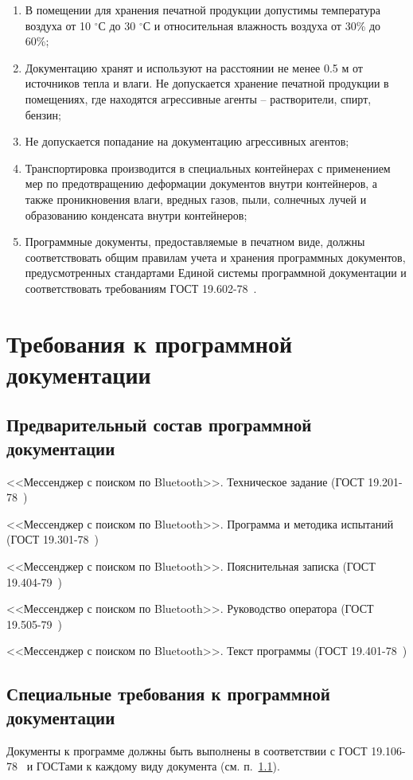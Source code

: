 \documentclass[techtask]{espd}
\begin{document}
\begin{enumerate}
\item В помещении для хранения печатной продукции допустимы температура воздуха от 10 $^\circ$С до 30 $^\circ$С и относительная влажность воздуха от 30\% до 60\%;
\item Документацию хранят и используют на расстоянии не менее 0.5 м от источников тепла и влаги. Не допускается хранение печатной продукции в помещениях, где находятся агрессивные агенты – растворители, спирт, бензин;
\item Не допускается попадание на документацию агрессивных агентов;
\item Транспортировка производится в специальных контейнерах с применением мер по предотвращению деформации документов внутри контейнеров, а также проникновения влаги, вредных газов, пыли, солнечных лучей и образованию конденсата внутри контейнеров;
\item Программные документы, предоставляемые в печатном виде, должны соответствовать общим правилам учета и хранения программных документов, предусмотренных стандартами Единой системы программной документации и соответствовать требованиям ГОСТ 19.602-78~\cite{espd602}.
\end{enumerate}

\section{Требования к программной документации}
\subsection{Предварительный состав программной документации}\label{subsection:documentation}
<<Мессенджер с поиском по Bluetooth>>. Техническое задание (ГОСТ 19.201-78~\cite{espd201})

<<Мессенджер с поиском по Bluetooth>>. Программа и методика испытаний (ГОСТ 19.301-78~\cite{espd301})

<<Мессенджер с поиском по Bluetooth>>. Пояснительная записка (ГОСТ 19.404-79~\cite{espd404})

<<Мессенджер с поиском по Bluetooth>>. Руководство оператора (ГОСТ 19.505-79~\cite{espd505})

<<Мессенджер с поиском по Bluetooth>>. Текст программы (ГОСТ 19.401-78~\cite{espd401})

\subsection{Специальные требования к программной документации}\label{subsection:docspec}
Документы к программе должны быть выполнены в соответствии с ГОСТ 19.106-78~\cite{espd106} и ГОСТами к каждому виду документа (см. п.~\ref{subsection:documentation}).
\end{document}
